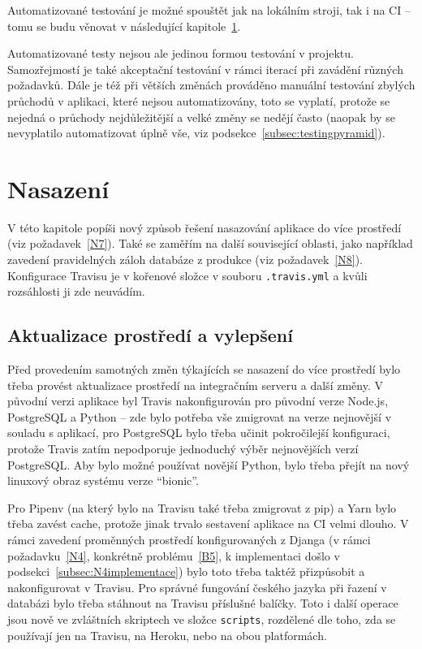 Automatizované testování je možné spouštět jak na lokálním stroji, tak i na CI -- tomu se budu věnovat v následující kapitole~\ref{chap:nasazeni}.

Automatizované testy nejsou ale jedinou formou testování v projektu. Samozřejmostí je také akceptační testování v rámci iterací při zavádění různých požadavků. Dále je též při větších změnách prováděno manuální testování zbylých průchodů v aplikaci, které nejsou automatizovány, toto se vyplatí, protože se nejedná o průchody nejdůležitější a velké změny se nedějí často (naopak by se nevyplatilo automatizovat úplně vše, viz podsekce~\ref{subsec:testingpyramid}).

\chapter{Nasazení}\label{chap:nasazeni}

V této kapitole popíši nový způsob řešení nasazování aplikace do více prostředí (viz požadavek~\ref{N7}). Také se zaměřím na další související oblasti, jako například zavedení pravidelných záloh databáze z produkce (viz požadavek~\ref{N8}). Konfigurace Travisu je v kořenové složce v souboru \verb|.travis.yml| a kvůli rozsáhlosti ji zde neuvádím.

\section{Aktualizace prostředí a vylepšení}

Před provedením samotných změn týkajících se nasazení do více prostředí bylo třeba provést aktualizace prostředí na integračním serveru a další změny. V původní verzi aplikace byl Travis nakonfigurován pro původní verze Node.js, PostgreSQL a Python -- zde bylo potřeba vše zmigrovat na verze nejnovější v souladu s aplikací, pro PostgreSQL bylo třeba učinit pokročilejší konfiguraci, protože Travis zatím nepodporuje jednoduchý výběr nejnovějších verzí PostgreSQL. Aby bylo možné používat novější Python, bylo třeba přejít na nový linuxový obraz systému verze \enquote{bionic}.

Pro Pipenv (na který bylo na Travisu také třeba zmigrovat z pip) a Yarn bylo třeba zavést cache, protože jinak trvalo sestavení aplikace na CI velmi dlouho. V rámci zavedení proměnných prostředí konfigurovaných z Djanga (v rámci požadavku~\ref{N4}, konkrétně problému~\ref{B5}, k implementaci došlo v podsekci~\ref{subsec:N4implementace}) bylo toto třeba taktéž přizpůsobit a nakonfigurovat v Travisu. Pro správné fungování českého jazyka při řazení v databázi bylo třeba stáhnout na Travisu příslušné balíčky. Toto i další operace jsou nově ve zvláštních skriptech ve složce \verb|scripts|, rozdělené dle toho, zda se používají jen na Travisu, na Heroku, nebo na obou platformách.

